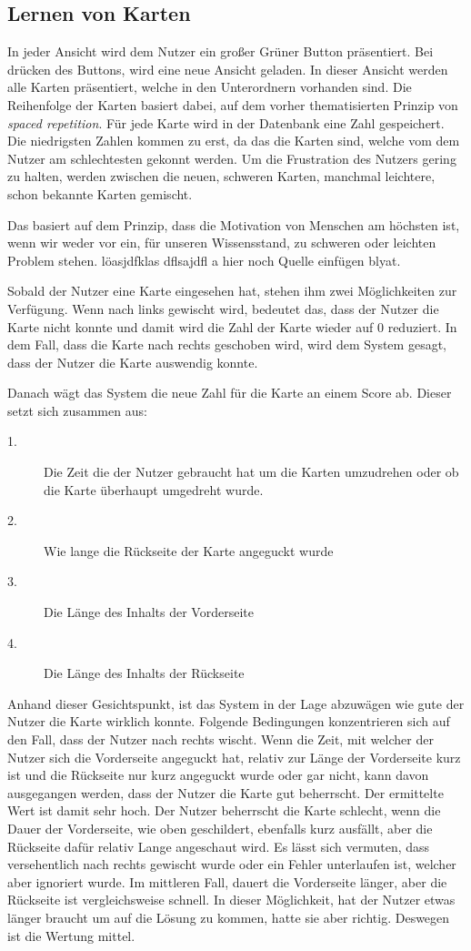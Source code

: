 \subsection{Lernen von Karten}
In jeder Ansicht wird dem Nutzer ein großer Grüner Button präsentiert. Bei drücken des Buttons, wird eine neue Ansicht geladen. In dieser Ansicht werden alle Karten präsentiert, welche in den Unterordnern vorhanden sind. Die Reihenfolge der Karten basiert dabei, auf dem vorher thematisierten Prinzip von \textit{spaced repetition}. Für jede Karte wird in der Datenbank eine Zahl gespeichert. Die niedrigsten Zahlen kommen zu erst, da das die Karten sind, welche vom dem Nutzer am schlechtesten gekonnt werden. Um die Frustration des Nutzers gering zu halten, werden zwischen die neuen, schweren Karten, manchmal leichtere, schon bekannte Karten gemischt.

Das basiert auf dem Prinzip, dass die Motivation von Menschen am höchsten ist, wenn wir weder vor ein, für unseren Wissensstand, zu schweren oder leichten Problem stehen. löasjdfklas dflsajdfl a hier noch Quelle einfügen blyat.

Sobald der Nutzer eine Karte eingesehen hat, stehen ihm zwei Möglichkeiten zur Verfügung. Wenn nach links gewischt wird, bedeutet das, dass der Nutzer die Karte nicht konnte und damit wird die Zahl der Karte wieder auf 0 reduziert. In dem Fall, dass die Karte nach rechts geschoben wird, wird dem System gesagt, dass der Nutzer die Karte auswendig konnte.

Danach wägt das System die neue Zahl für die Karte an einem Score ab. Dieser setzt sich zusammen aus:

\begin{description}
\item[1.]
Die Zeit die der Nutzer gebraucht hat um die Karten umzudrehen oder ob die Karte überhaupt umgedreht wurde. 
\item[2.]
Wie lange die Rückseite der Karte angeguckt wurde
\item[3.]
Die Länge des Inhalts der Vorderseite
\item[4.]
Die Länge des Inhalts der Rückseite
\end{description}

Anhand dieser Gesichtspunkt, ist das System in der Lage abzuwägen wie gute der Nutzer die Karte wirklich konnte. Folgende Bedingungen konzentrieren sich auf den Fall, dass der Nutzer nach rechts wischt. Wenn die Zeit, mit welcher der Nutzer sich die Vorderseite angeguckt hat, relativ zur Länge der Vorderseite kurz ist und die Rückseite nur kurz angeguckt wurde oder gar nicht, kann davon ausgegangen werden, dass der Nutzer die Karte gut beherrscht. Der ermittelte Wert ist damit sehr hoch. Der Nutzer beherrscht die Karte schlecht, wenn die Dauer der Vorderseite, wie oben geschildert, ebenfalls kurz ausfällt, aber die Rückseite dafür relativ Lange angeschaut wird. Es lässt sich vermuten, dass versehentlich nach rechts gewischt wurde oder ein Fehler unterlaufen ist, welcher aber ignoriert wurde. Im mittleren Fall, dauert die Vorderseite länger, aber die Rückseite ist vergleichsweise schnell. In dieser Möglichkeit, hat der Nutzer etwas länger braucht um auf die Lösung zu kommen, hatte sie aber richtig. Deswegen ist die Wertung mittel.

